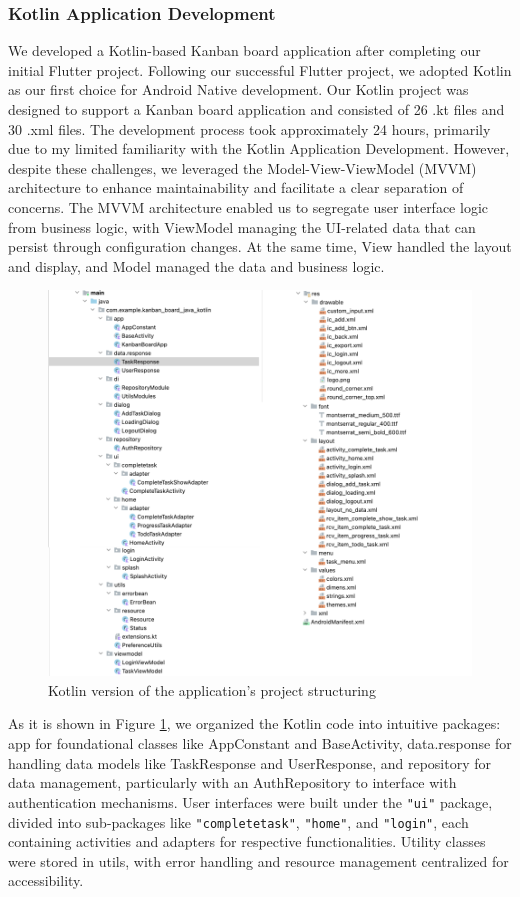 \subsubsection{Kotlin Application Development} 
We developed a Kotlin-based Kanban board application after completing our initial Flutter project. Following our successful Flutter project, we adopted Kotlin as our first choice for Android Native development. Our Kotlin project was designed to support a Kanban board application and consisted of 26 .kt files and 30 .xml files. The development process took approximately 24 hours, primarily due to my limited familiarity with the Kotlin Application Development.
However, despite these challenges, we leveraged the Model-View-ViewModel (MVVM) architecture to enhance maintainability and facilitate a clear separation of concerns. The MVVM \cite{Sewak_2023} architecture enabled us to segregate user interface logic from business logic, with ViewModel managing the UI-related data that can persist through configuration changes. At the same time, View handled the layout and display, and Model managed the data and business logic.
\begin{figure}[htbp]
    \centering
    \includegraphics[scale = 0.8]{img/kotlin_project_struct.png}
    \caption{Kotlin version of the application’s project structuring}
    \label{fig:kotlin_project_struct}
\end{figure}
\par
As it is shown in Figure \ref*{fig:kotlin_project_struct}, we organized the Kotlin code into intuitive packages: app for foundational classes like AppConstant and BaseActivity, data.response for handling data models like TaskResponse and UserResponse, and repository for data management, particularly with an AuthRepository to interface with authentication mechanisms. User interfaces were built under the \verb|"ui"| package, divided into sub-packages like \verb|"completetask"|, \verb|"home"|, and \verb|"login"|, each containing activities and adapters for respective functionalities. Utility classes were stored in utils, with error handling and resource management centralized for accessibility.
